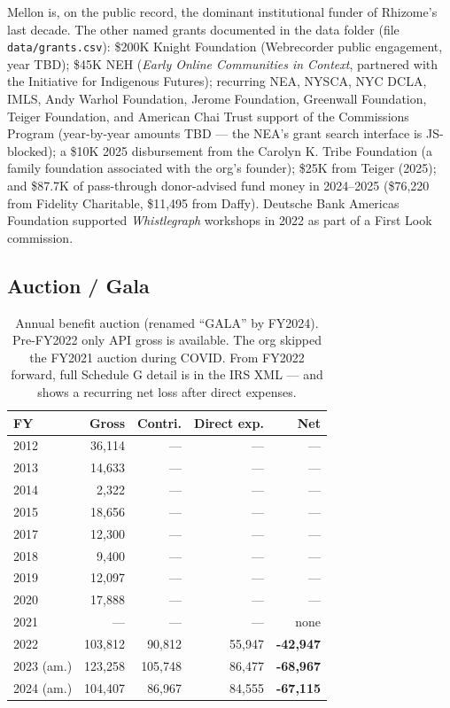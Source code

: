 \documentclass[10pt,letterpaper,twocolumn]{article}
\begin{document}
Mellon is, on the public record, the dominant institutional funder of Rhizome's last decade. The other named grants documented in the data folder (file \texttt{data/grants.csv}): \$200K Knight Foundation (Webrecorder public engagement, year TBD); \$45K NEH (\emph{Early Online Communities in Context}, partnered with the Initiative for Indigenous Futures); recurring NEA, NYSCA, NYC DCLA, IMLS, Andy Warhol Foundation, Jerome Foundation, Greenwall Foundation, Teiger Foundation, and American Chai Trust support of the Commissions Program (year-by-year amounts TBD --- the NEA's grant search interface is JS-blocked); a \$10K 2025 disbursement from the Carolyn K. Tribe Foundation (a family foundation associated with the org's founder); \$25K from Teiger (2025); and \$87.7K of pass-through donor-advised fund money in 2024--2025 (\$76,220 from Fidelity Charitable, \$11,495 from Daffy). Deutsche Bank Americas Foundation supported \emph{Whistlegraph} workshops in 2022 as part of a First Look commission.

\subsection{Auction / Gala}\label{sec:auction}

\begin{table}[h]
\footnotesize
\centering
\begin{tabularx}{\columnwidth}{Xrrrr}
\toprule
\textbf{FY} & \textbf{Gross} & \textbf{Contri.} & \textbf{Direct exp.} & \textbf{Net} \\
\midrule
2012 & 36,114 & --- & --- & --- \\
2013 & 14,633 & --- & --- & --- \\
2014 & 2,322 & --- & --- & --- \\
2015 & 18,656 & --- & --- & --- \\
2017 & 12,300 & --- & --- & --- \\
2018 & 9,400 & --- & --- & --- \\
2019 & 12,097 & --- & --- & --- \\
2020 & 17,888 & --- & --- & --- \\
2021 & --- & --- & --- & none \\
2022 & 103,812 & 90,812 & 55,947 & \textbf{-42,947} \\
2023 (am.) & 123,258 & 105,748 & 86,477 & \textbf{-68,967} \\
2024 (am.) & 104,407 & 86,967 & 84,555 & \textbf{-67,115} \\
\bottomrule
\end{tabularx}
\caption{Annual benefit auction (renamed ``GALA'' by FY2024). Pre-FY2022 only API gross is available. The org skipped the FY2021 auction during COVID. From FY2022 forward, full Schedule G detail is in the IRS XML --- and shows a recurring net loss after direct expenses.}
\label{tab:auction}
\end{table}
\end{document}
